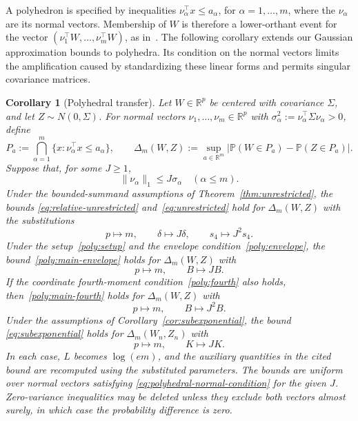 \documentclass[11pt,letterpaper]{article}
\newenvironment{recovered}{}{}
\newtheorem{corollary}{Corollary}
\theoremstyle{remark}
\newcommand{\Pp}{\mathbb P}
\newcommand{\R}{\mathbb R}
\begin{document}
\begin{recovered}
A polyhedron is specified by inequalities
\(\nu_\alpha^\top x\le a_\alpha\), for \(\alpha=1,\ldots,m\),
where the \(\nu_\alpha\) are its normal vectors. Membership of
\(W\) is therefore a lower-orthant event for the vector
\((\nu_1^\top W,\ldots,\nu_m^\top W)\), as
in~\cite[Section~3.1]{CCK2017}.
The following corollary extends our Gaussian approximation bounds to
polyhedra. Its condition on the normal vectors limits the amplification
caused by standardizing these linear forms and permits singular
covariance matrices.
\end{recovered}

\begin{recovered}
\begin{corollary}[Polyhedral transfer]\label{cor:polyhedral-transfer}
Let \(W\in\R^p\) be centered with covariance \(\Sigma\), and let
\(Z\sim N(0,\Sigma)\). For normal vectors \(\nu_1,\ldots,\nu_m\in\R^p\)
with \(\sigma_\alpha^2:=\nu_\alpha^\top\Sigma\nu_\alpha>0\), define
\[
 P_a:=\bigcap_{\alpha=1}^m\{x:\nu_\alpha^\top x\le a_\alpha\},
 \qquad
 \Delta_m(W,Z):=\sup_{a\in\R^m}
 \bigl|\Pp(W\in P_a)-\Pp(Z\in P_a)\bigr|.
\]
Suppose that, for some \(J\ge1\),
\begin{equation}
 \|\nu_\alpha\|_1\le J\sigma_\alpha\quad(\alpha\le m).
 \label{eq:polyhedral-normal-condition}
\end{equation}
Under the bounded-summand assumptions of Theorem~\ref{thm:unrestricted},
the bounds \eqref{eq:relative-unrestricted} and~\eqref{eq:unrestricted}
hold for \(\Delta_m(W,Z)\) with the substitutions
\[
 p\mapsto m,\qquad \delta\mapsto J\delta,\qquad s_4\mapsto J^2s_4.
\]
Under the setup~\eqref{poly:setup} and the envelope
condition~\eqref{poly:envelope}, the bound~\eqref{poly:main-envelope}
holds for \(\Delta_m(W,Z)\) with
\[
 p\mapsto m,\qquad B\mapsto JB.
\]
If the coordinate fourth-moment condition~\eqref{poly:fourth} also holds,
then~\eqref{poly:main-fourth} holds for \(\Delta_m(W,Z)\) with
\[
 p\mapsto m,\qquad B\mapsto J^2B.
\]
Under the assumptions of Corollary~\ref{cor:subexponential},
the bound \eqref{eq:subexponential} holds for \(\Delta_m(W_n,Z_n)\) with
\[
 p\mapsto m,\qquad K\mapsto JK.
\]
In each case, \(L\) becomes \(\log(em)\), and the auxiliary quantities
in the cited bound are recomputed using the substituted parameters.
The bounds are uniform over normal vectors satisfying
\eqref{eq:polyhedral-normal-condition} for the given \(J\).
Zero-variance inequalities may be deleted unless they exclude both
vectors almost surely, in which case the probability difference is zero.
\end{corollary}
\end{recovered}
\end{document}
